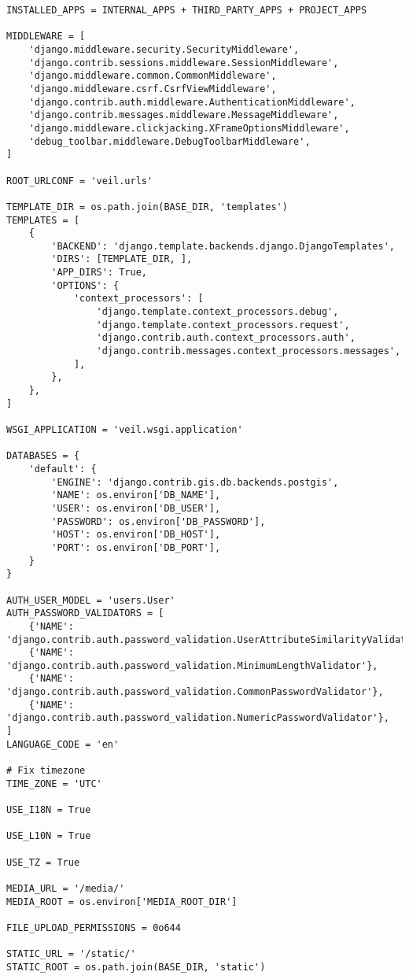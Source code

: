 \begin{lstlisting}
INSTALLED_APPS = INTERNAL_APPS + THIRD_PARTY_APPS + PROJECT_APPS

MIDDLEWARE = [
    'django.middleware.security.SecurityMiddleware',
    'django.contrib.sessions.middleware.SessionMiddleware',
    'django.middleware.common.CommonMiddleware',
    'django.middleware.csrf.CsrfViewMiddleware',
    'django.contrib.auth.middleware.AuthenticationMiddleware',
    'django.contrib.messages.middleware.MessageMiddleware',
    'django.middleware.clickjacking.XFrameOptionsMiddleware',
    'debug_toolbar.middleware.DebugToolbarMiddleware',
]

ROOT_URLCONF = 'veil.urls'

TEMPLATE_DIR = os.path.join(BASE_DIR, 'templates')
TEMPLATES = [
    {
        'BACKEND': 'django.template.backends.django.DjangoTemplates',
        'DIRS': [TEMPLATE_DIR, ],
        'APP_DIRS': True,
        'OPTIONS': {
            'context_processors': [
                'django.template.context_processors.debug',
                'django.template.context_processors.request',
                'django.contrib.auth.context_processors.auth',
                'django.contrib.messages.context_processors.messages',
            ],
        },
    },
]

WSGI_APPLICATION = 'veil.wsgi.application'

DATABASES = {
    'default': {
        'ENGINE': 'django.contrib.gis.db.backends.postgis',
        'NAME': os.environ['DB_NAME'],
        'USER': os.environ['DB_USER'],
        'PASSWORD': os.environ['DB_PASSWORD'],
        'HOST': os.environ['DB_HOST'],
        'PORT': os.environ['DB_PORT'],
    }
}

AUTH_USER_MODEL = 'users.User'
AUTH_PASSWORD_VALIDATORS = [
    {'NAME': 'django.contrib.auth.password_validation.UserAttributeSimilarityValidator'},
    {'NAME': 'django.contrib.auth.password_validation.MinimumLengthValidator'},
    {'NAME': 'django.contrib.auth.password_validation.CommonPasswordValidator'},
    {'NAME': 'django.contrib.auth.password_validation.NumericPasswordValidator'},
]
LANGUAGE_CODE = 'en'

# Fix timezone
TIME_ZONE = 'UTC'

USE_I18N = True

USE_L10N = True

USE_TZ = True

MEDIA_URL = '/media/'
MEDIA_ROOT = os.environ['MEDIA_ROOT_DIR']

FILE_UPLOAD_PERMISSIONS = 0o644

STATIC_URL = '/static/'
STATIC_ROOT = os.path.join(BASE_DIR, 'static')


\end{lstlisting}
